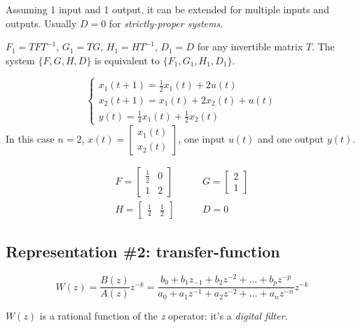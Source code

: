Assuming 1 input and 1 output, it can be extended for multiple inputs and outputs. Usually $D=0$ for \emph{strictly-proper systems}.

\begin{rem}
    $F_1 = TFT^{-1}$, $G_1 = TG$, $H_1 = HT^{-1}$, $D_1 = D$ for any invertible matrix $T$. The system $\{F, G, H, D\}$ is equivalent to $\{F_1, G_1, H_1, D_1\}$.
\end{rem}

\begin{exa}
    \[
        \begin{cases}
            x_1(t+1) = \frac{1}{2} x_1(t) + 2u(t) \\
            x_2(t+1) = x_1(t) + 2x_2(t) + u(t) \\
            y(t) = \frac{1}{4}x_1(t) + \frac{1}{2}x_2(t)
        \end{cases}
    \]
    In this case $n=2$, $x(t) = \begin{bmatrix}
        x_1(t) \\
        x_2(t)
    \end{bmatrix}$, one input $u(t)$ and one output $y(t)$.

    \begin{align*}
        F = \begin{bmatrix}
            \frac{1}{2} & 0 \\
            1 & 2
        \end{bmatrix}
        & \qquad
        G = \begin{bmatrix}
            2 \\ 1
        \end{bmatrix}
        \\
        H = \begin{bmatrix}
            \frac{1}{4} & \frac{1}{2}
        \end{bmatrix}
        & \qquad
        D = 0
    \end{align*}
\end{exa}

\subsection{Representation \#2: transfer-function}

\[
    W(z) = \frac{B(z)}{A(z)} z^{-k} = \frac{b_0 + b_1z_{-1} + b_2z^{-2} + \ldots + b_pz^{-p}}{a_0 + a_1z^{-1} + a_2z^{-2} + \ldots + a_nz^{-n}} z^{-k}
\]

$W(z)$ is a rational function of the \emph{z} operator: it's a \emph{digital filter}.

